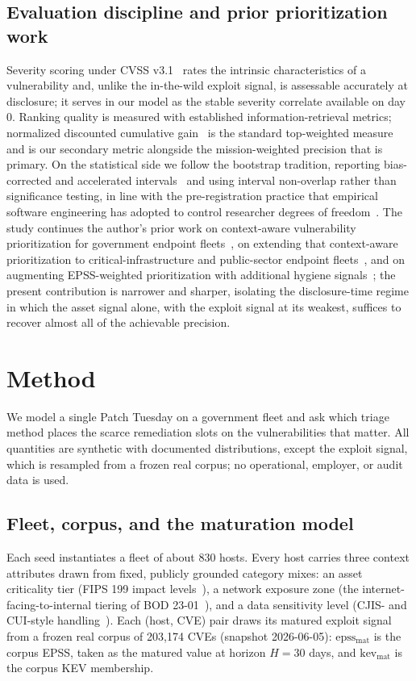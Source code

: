 \documentclass[journal]{IEEEtran}
\begin{document}
\subsection{Evaluation discipline and prior prioritization work}
Severity scoring under CVSS v3.1~\cite{cvss31} rates the intrinsic characteristics of a
vulnerability and, unlike the in-the-wild exploit signal, is assessable accurately at disclosure;
it serves in our model as the stable severity correlate available on day 0. Ranking quality is
measured with established information-retrieval metrics; normalized discounted cumulative
gain~\cite{jarvelin2002ndcg} is the standard top-weighted measure and is our secondary metric
alongside the mission-weighted precision that is primary. On the statistical side we follow the
bootstrap tradition, reporting bias-corrected and accelerated
intervals~\cite{efron1987bca,efron1994introduction} and using interval non-overlap rather than
significance testing, in line with the pre-registration practice that empirical software
engineering has adopted to control researcher degrees of freedom~\cite{wohlin2012experimentation}.
The study continues the author's prior work on context-aware vulnerability prioritization for
government endpoint fleets~\cite{paper1vulnprio}, on extending that context-aware prioritization to
critical-infrastructure and public-sector endpoint fleets~\cite{paper11capg}, and on augmenting
EPSS-weighted prioritization with additional hygiene signals~\cite{paper4hygieneprio}; the present
contribution is narrower and sharper,
isolating the disclosure-time regime in which the asset signal alone, with the exploit signal at
its weakest, suffices to recover almost all of the achievable precision.

\section{Method}
We model a single Patch Tuesday on a government fleet and ask which triage method places the scarce
remediation slots on the vulnerabilities that matter. All quantities are synthetic with documented
distributions, except the exploit signal, which is resampled from a frozen real corpus; no
operational, employer, or audit data is used.

\subsection{Fleet, corpus, and the maturation model}
Each seed instantiates a fleet of about 830 hosts. Every host carries three context attributes
drawn from fixed, publicly grounded category mixes: an asset criticality tier (FIPS 199 impact
levels~\cite{fips199}), a network exposure zone (the internet-facing-to-internal tiering of BOD
23-01~\cite{cisabod2301}), and a data sensitivity level (CJIS- and CUI-style
handling~\cite{cjis2023}). Each (host, CVE) pair draws its matured exploit signal from a frozen
real corpus of 203{,}174 CVEs (snapshot 2026-06-05): $\mathrm{epss_{mat}}$ is the corpus EPSS, taken
as the matured value at horizon $H = 30$ days, and $\mathrm{kev_{mat}}$ is the corpus KEV membership.
\end{document}
